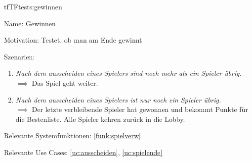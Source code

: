 \begin{description}[leftmargin=5em, style=sameline]

\begin{lhp}{tf}{TF}{tests:gewinnen}
	\item [Name:] Gewinnen
	\item [Motivation:] Testet, ob man am Ende gewinnt
	\item [Szenarien:] \hfill
		\begin{enumerate}
			\item \textit{Nach dem ausscheiden eines Spielers sind noch mehr als ein Spieler übrig.} \\ $\implies$  Das Spiel geht weiter.
			\item \textit{Nach dem ausscheiden eines Spielers ist nur noch ein Spieler übrig.} \\ $\implies$  Der letzte	verbleibende Spieler hat gewonnen und bekommt Punkte für die Bestenliste. Alle Spieler kehren zurück in die Lobby.	
		\end{enumerate}
	\item [Relevante Systemfunktionen:] \ref{funk:spielverw}
	\item [Relevante Use Cases:] \ref{uc:ausscheiden}, \ref{uc:spielende}
\end{lhp}

\end{description}
























